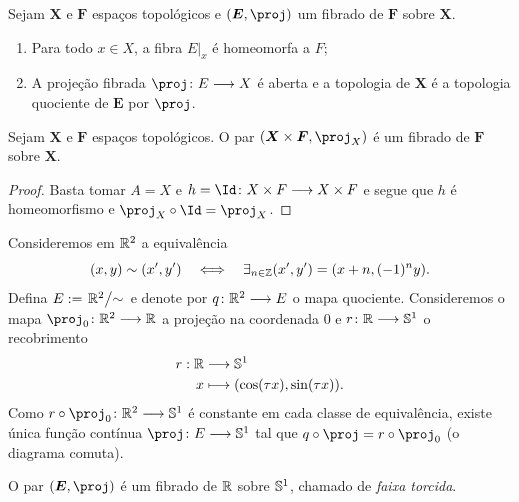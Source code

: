 \begin{prop}
Sejam $\bm X$ e $\bm F$ espaços topológicos e $(\bm E,\proj)$ um fibrado de $\bm F$ sobre $\bm X$.
	\begin{enumerate}
	\item Para todo $x \in X$, a fibra $E|_x$ é homeomorfa a $F$;
	\item A projeção fibrada $\proj\colon E \to X$ é aberta e a topologia de $\bm X$ é a topologia quociente de $\bm E$ por $\proj$.
	\end{enumerate}
\end{prop}

\begin{prop}
Sejam $\bm X$ e $\bm F$ espaços topológicos. O par $(\bm X \times \bm F,\proj_X)$ é um fibrado de $\bm F$ sobre $\bm X$.
\end{prop}
\begin{proof}
Basta tomar $A=X$ e $h= \Id\colon X \times F \to X \times F$ e segue que $h$ é homeomorfismo e $\proj_X \circ \Id = \proj_X$.
\end{proof}

\begin{ex}
Consideremos em $\R^2$ a equivalência
	\begin{equation*}
	(x,y) \sim (x',y') \sse \exists_{n \in \Z} (x',y') = (x+n,(-1)^n y).
	\end{equation*}
Defina $E := \quo{\R^2}{\sim}$ e denote por $q\colon \R^2 \to E$ o mapa quociente. Consideremos o mapa $\proj_0\colon \R^2 \to \R$ a projeção na coordenada $0$ e $r\colon \R \to \S^1$ o recobrimento
	\begin{align*}
	\func{r}{\R}{\S^1}{x}{(\cos(\tau x),\sin(\tau x))}.
	\end{align*}
Como $r \circ \proj_0\colon \R^2 \to \S^1$ é constante em cada classe de equivalência, existe única função contínua $\proj\colon E \to \S^1$ tal que $q \circ \proj = r \circ \proj_0$ (o diagrama comuta).
\begin{figure}
\centering
{}
\end{figure}
O par $(\bm E,\proj)$ é um fibrado de $\R$ sobre $\S^1$, chamado de \emph{faixa torcida}.
\end{ex}

